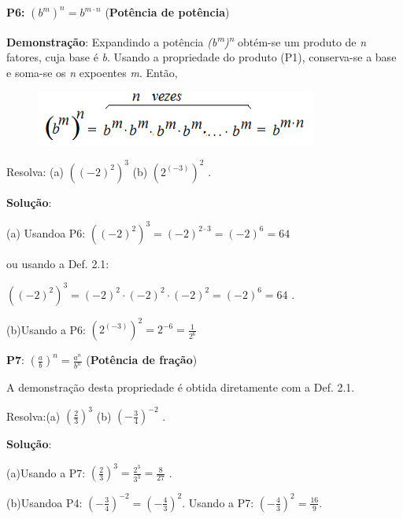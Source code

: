 \begin{caixa}
\textbf{P6:} $(b^m)^n = b^{m \cdot n}$ (\textbf{Potência de potência})
\end{caixa}

\textbf{Demonstração}: Expandindo a potência \textit{(b\textsuperscript{m})\textsuperscript{n}} obtém-se um produto de \textit{n} fatores, cuja base é \textit{b}. Usando a propriedade do produto (P1), conserva-se a base e soma-se os \textit{n} expoentes \textit{m}. Então,

\begin{figure}[H]
	\begin{Center}
		\includegraphics[width=3.65in,height=0.71in]{capitulos/potencias_e_funcoes_exponenciais/media/image6.png}
	\end{Center}
\end{figure}

 \qedsymbol{}

\begin{texemplo}
Resolva: (a) \(  \left(  \left( -2 \right) ^{2} \right) ^{3} \)  (b)  \(  \left( 2^{ \left( -3 \right) } \right) ^{2} \) .

\textbf{Solução}: 

(a) Usandoa P6:   \(  \left(  \left( -2 \right) ^{2} \right) ^{3}= \left( -2 \right) ^{2 \cdot 3}= \left( -2 \right) ^{6}=64~  \)  

ou usando a Def. 2.1:

  \(  \left(  \left( -2 \right) ^{2} \right) ^{3}= \left( -2 \right) ^{2} \cdot  \left( -2 \right) ^{2} \cdot  \left( -2 \right) ^{2}= \left( -2 \right) ^{6}=64  \)  .

 (b)Usando a P6:   \(  \left( 2^{ \left( -3 \right) } \right) ^{2}=2^{-6}=\frac{1}{2^{6}} \)  \qedsymbol{}
\end{texemplo}

\begin{caixa}
\textbf{P7}:  \(  \left( \frac{a}{b} \right) ^{n}=\frac{a^{n}}{b^{n}} \)  (\textbf{Potência de fração})
\end{caixa}

A demonstração desta propriedade é obtida diretamente com a Def. 2.1. 

\begin{texemplo}Resolva:(a)   \(  \left( \frac{2}{3} \right) ^{3} \)  (b)  \(  \left( -\frac{3}{4} \right) ^{-2} \) .

\textbf{Solução}: 

 (a)Usando a P7:   \(  \left( \frac{2}{3} \right) ^{3}=\frac{2^{3}}{3^{3}}=\frac{8}{27} \)  .

 (b)Usandoa P4:    \(  \left( -\frac{3}{4} \right) ^{-2}= \left( -\frac{4}{3} \right) ^{2}. \)  Usando a P7:   \(  \left( -\frac{4}{3} \right) ^{2}=\frac{16}{9}. \)  \qedsymbol{}
\end{texemplo}

